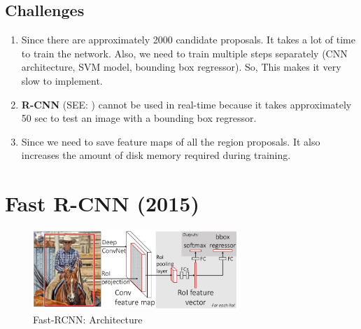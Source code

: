 \subsection*{Challenges}
\begin{enumerate}
    \item Since there are approximately 2000 candidate proposals. It takes a lot of time to train the network. Also, we need to train multiple steps separately (CNN architecture, SVM model, bounding box regressor). So, This makes it very slow to implement.

    \item \textbf{R-CNN} (SEE: ) cannot be used in real-time because it takes approximately 50 sec to test an image with a bounding box regressor.

    \item Since we need to save feature maps of all the region proposals. It also increases the amount of disk memory required during training.
\end{enumerate}











\section{Fast R-CNN (2015) \cite{arxiv/1504.08083-fast-rcnn,medium/towardsdatascience.com/fast-r-cnn-for-object-detection-a-technical-summary-a0ff94faa022}}\label{Fast R-CNN}

\begin{figure}[h]
    \centering
    \includegraphics[width=\linewidth, height=3cm, keepaspectratio]{Pictures/convolutional-neural-network/fast-rcnn-arch.png}
    \caption*{Fast-RCNN: Architecture \cite{arxiv/1504.08083-fast-rcnn}}
\end{figure}


